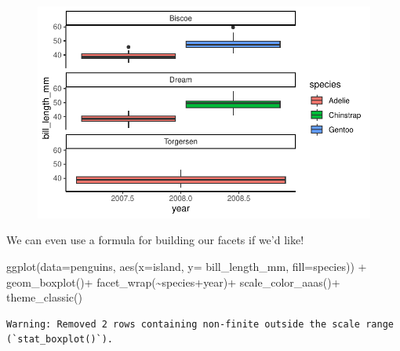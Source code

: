\documentclass[
  letterpaper,
  DIV=11,
  numbers=noendperiod]{scrartcl}
\newenvironment{Shaded}{\begin{snugshade}}{\end{snugshade}}
\newcommand{\AttributeTok}[1]{\textcolor[rgb]{0.40,0.45,0.13}{#1}}
\newcommand{\FunctionTok}[1]{\textcolor[rgb]{0.28,0.35,0.67}{#1}}
\newcommand{\NormalTok}[1]{\textcolor[rgb]{0.00,0.23,0.31}{#1}}
\newcommand{\SpecialCharTok}[1]{\textcolor[rgb]{0.37,0.37,0.37}{#1}}
\begin{document}
\begin{figure}[H]

{\centering \includegraphics{Lab_2_files/figure-pdf/unnamed-chunk-35-1.pdf}

}

\end{figure}

We can even use a formula for building our facets if we'd like!

\begin{Shaded}
\begin{Highlighting}[]
\FunctionTok{ggplot}\NormalTok{(}\AttributeTok{data=}\NormalTok{penguins, }\FunctionTok{aes}\NormalTok{(}\AttributeTok{x=}\NormalTok{island, }\AttributeTok{y=}\NormalTok{ bill\_length\_mm, }\AttributeTok{fill=}\NormalTok{species)) }\SpecialCharTok{+}
  \FunctionTok{geom\_boxplot}\NormalTok{()}\SpecialCharTok{+}
  \FunctionTok{facet\_wrap}\NormalTok{(}\SpecialCharTok{\textasciitilde{}}\NormalTok{species}\SpecialCharTok{+}\NormalTok{year)}\SpecialCharTok{+}
  \FunctionTok{scale\_color\_aaas}\NormalTok{()}\SpecialCharTok{+}
  \FunctionTok{theme\_classic}\NormalTok{()}
\end{Highlighting}
\end{Shaded}

\begin{verbatim}
Warning: Removed 2 rows containing non-finite outside the scale range
(`stat_boxplot()`).
\end{verbatim}
\end{document}
